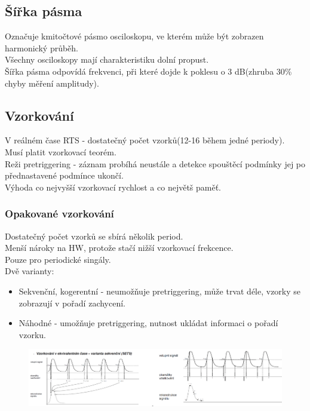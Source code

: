 \subsection*{Šířka pásma}
Označuje kmitočtové pásmo osciloskopu, ve kterém může být zobrazen harmonický průběh.\\
Všechny osciloskopy mají charakteristiku dolní propust.\\
Šířka pásma odpovídá frekvenci, při které dojde k poklesu o 3 dB(zhruba 30\% chyby měření amplitudy).\\

\subsection*{Vzorkování}
V reálném čase RTS - dostatečný počet vzorků(12-16 během jedné periody).\\
Musí platit vzorkovací teorém.\\
Reži  pretriggering - záznam probíhá neustále a detekce spouštěcí podmínky jej po přednastavené podmínce ukončí.\\
Výhoda co nejvyšší vzorkovací rychlost a co největš paměť.\\
\subsubsection*{Opakované vzorkování}
Dostatečný počet vzorků se sbírá několik period.\\
Menší nároky na HW, protože stačí nižší vzorkovací frekcence.\\
Pouze pro periodické singály.\\
Dvě varianty:
\begin{itemize}
    \item Sekvenční, kogerentní - neumožňuje pretriggering, může trvat déle, vzorky se zobrazují v pořadí zachycení.
    \item Náhodné - umožňuje pretriggering, nutnost ukládat informaci o pořadí vzorku.
\end{itemize}
\begin{figure}[H]
    \includegraphics*[scale = 0.8]{images/opakovaneVzorkovani.png}
\end{figure}
